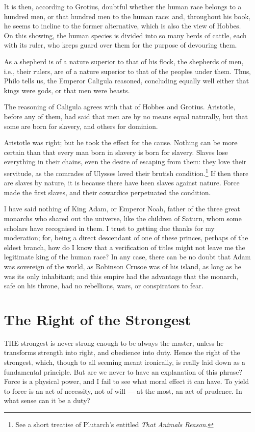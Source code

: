 \documentclass[12pt]{report}
\begin{document}
It is then, according to Grotius, doubtful whether the human race belongs to a hundred men, or that hundred men to the human race: and, throughout his book, he seems to incline to the former alternative, which is also the view of Hobbes. On this showing, the human species is divided into so many herds of cattle, each with its ruler, who keeps guard over them for the purpose of devouring them.

As a shepherd is of a nature superior to that of his flock, the shepherds of men, i.e., their rulers, are of a nature superior to that of the peoples under them. Thus, Philo tells us, the Emperor Caligula reasoned, concluding equally well either that kings were gods, or that men were beasts.

The reasoning of Caligula agrees with that of Hobbes and Grotius. Aristotle, before any of them, had said that men are by no means equal naturally, but that some are born for slavery, and others for dominion.

Aristotle was right; but he took the effect for the cause. Nothing can be more certain than that every man born in slavery is born for slavery. Slaves lose everything in their chains, even the desire of escaping from them: they love their servitude, as the comrades of Ulysses loved their brutish condition.\footnote{See a short treatise of Plutarch's entitled \textit{That Animals Reason}.} If then there are slaves by nature, it is because there have been slaves against nature. Force made the first slaves, and their cowardice perpetuated the condition.

I have said nothing of King Adam, or Emperor Noah, father of the three great monarchs who shared out the universe, like the children of Saturn, whom some scholars have recognised in them. I trust to getting due thanks for my moderation; for, being a direct descendant of one of these princes, perhaps of the eldest branch, how do I know that a verification of titles might not leave me the legitimate king of the human race? In any case, there can be no doubt that Adam was sovereign of the world, as Robinson Crusoe was of his island, as long as he was its only inhabitant; and this empire had the advantage that the monarch, safe on his throne, had no rebellions, wars, or conspirators to fear.
\clearpage
\section{The Right of the Strongest}
THE strongest is never strong enough to be always the master, unless he transforms strength into right, and obedience into duty. Hence the right of the strongest, which, though to all seeming meant ironically, is really laid down as a fundamental principle. But are we never to have an explanation of this phrase? Force is a physical power, and I fail to see what moral effect it can have. To yield to force is an act of necessity, not of will — at the most, an act of prudence. In what sense can it be a duty?
\end{document}
